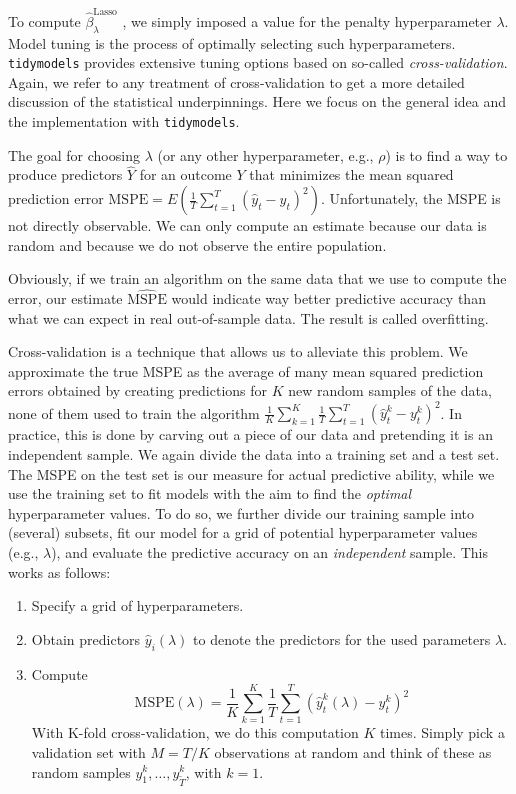 \documentclass[
]{krantz}
\providecommand{\tightlist}{%
  \setlength{\itemsep}{0pt}\setlength{\parskip}{0pt}}
\begin{document}
To compute \(\hat\beta_\lambda^\text{Lasso}\) , we simply imposed a value for the penalty hyperparameter \(\lambda\). Model tuning is the process of optimally selecting such hyperparameters. \texttt{tidymodels} provides extensive tuning options based on so-called \emph{cross-validation}. Again, we refer to any treatment of cross-validation to get a more detailed discussion of the statistical underpinnings. Here we focus on the general idea and the implementation with \texttt{tidymodels}.

The goal for choosing \(\lambda\) (or any other hyperparameter, e.g., \(\rho\)) is to find a way to produce predictors \(\hat{Y}\) for an outcome \(Y\) that minimizes the mean squared prediction error \(\text{MSPE} = E\left( \frac{1}{T}\sum_{t=1}^T (\hat{y}_t - y_t)^2 \right)\). Unfortunately, the MSPE is not directly observable. We can only compute an estimate because our data is random and because we do not observe the entire population.

Obviously, if we train an algorithm on the same data that we use to compute the error, our estimate \(\hat{\text{MSPE}}\) would indicate way better predictive accuracy than what we can expect in real out-of-sample data. The result is called overfitting.

Cross-validation is a technique that allows us to alleviate this problem. We approximate the true MSPE as the average of many mean squared prediction errors obtained by creating predictions for \(K\) new random samples of the data, none of them used to train the algorithm \(\frac{1}{K} \sum_{k=1}^K \frac{1}{T}\sum_{t=1}^T \left(\hat{y}_t^k - y_t^k\right)^2\). In practice, this is done by carving out a piece of our data and pretending it is an independent sample. We again divide the data into a training set and a test set. The MSPE on the test set is our measure for actual predictive ability, while we use the training set to fit models with the aim to find the \emph{optimal} hyperparameter values. To do so, we further divide our training sample into (several) subsets, fit our model for a grid of potential hyperparameter values (e.g., \(\lambda\)), and evaluate the predictive accuracy on an \emph{independent} sample. This works as follows:

\begin{enumerate}
\def\labelenumi{\arabic{enumi}.}
\tightlist
\item
  Specify a grid of hyperparameters.
\item
  Obtain predictors \(\hat{y}_i(\lambda)\) to denote the predictors for the used parameters \(\lambda\).
\item
  Compute \[
  \text{MSPE}(\lambda) = \frac{1}{K} \sum_{k=1}^K \frac{1}{T}\sum_{t=1}^T \left(\hat{y}_t^k(\lambda) - y_t^k\right)^2 
  \] With K-fold cross-validation, we do this computation \(K\) times. Simply pick a validation set with \(M=T/K\) observations at random and think of these as random samples \(y_1^k, \dots, y_{\tilde{T}}^k\), with \(k=1\).
\end{enumerate}
\end{document}
